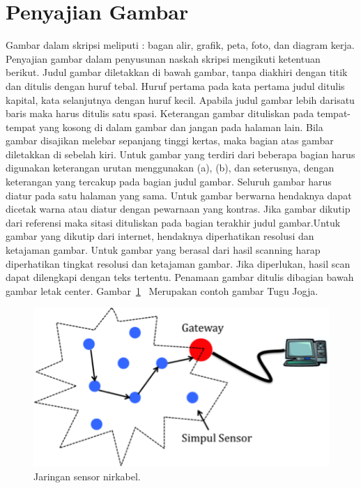 \section*{Penyajian Gambar }
Gambar dalam skripsi meliputi : bagan alir, grafik, peta, foto, dan diagram kerja. Penyajian gambar dalam penyusunan naskah skripsi mengikuti ketentuan berikut. Judul gambar diletakkan di bawah gambar, tanpa diakhiri dengan titik dan ditulis dengan huruf tebal. Huruf pertama pada kata pertama judul ditulis kapital, kata selanjutnya dengan huruf kecil. Apabila judul gambar lebih darisatu baris maka harus ditulis satu spasi. Keterangan gambar dituliskan pada tempat-tempat yang kosong di dalam gambar dan jangan pada halaman lain. Bila gambar disajikan melebar sepanjang tinggi kertas, maka bagian atas gambar diletakkan di sebelah kiri.
Untuk gambar yang terdiri dari beberapa bagian harus digunakan keterangan urutan menggunakan (a), (b), dan seterusnya, dengan keterangan yang tercakup pada bagian judul gambar. Seluruh gambar harus diatur pada satu halaman yang sama. Untuk gambar berwarna hendaknya dapat dicetak warna atau diatur dengan pewarnaan yang kontras.
Jika gambar dikutip dari referensi maka sitasi dituliskan pada bagian terakhir judul gambar.Untuk gambar yang dikutip dari internet, hendaknya diperhatikan resolusi dan ketajaman gambar. Untuk gambar yang berasal dari hasil scanning harap diperhatikan tingkat resolusi dan ketajaman gambar. Jika diperlukan, hasil scan dapat dilengkapi dengan teks tertentu. Penamaan gambar  ditulis dibagian bawah gambar letak center. Gambar~\ref{wsn}  Merupakan contoh gambar Tugu Jogja.
      \begin{figure}[H]
	\centering
	\includegraphics{gambar/wsn}
	\caption{Jaringan sensor nirkabel.}
	\label{wsn}
\end{figure}

 
